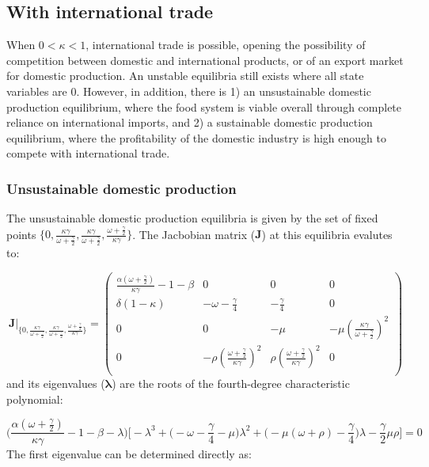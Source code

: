\documentclass[12pt]{article}
\begin{document}
\subsection{With international trade}
When $0 < \kappa < 1$, international trade is possible, opening the possibility of competition between domestic and international products, or of an export market for domestic production. An unstable equilibria still exists where all state variables are 0. However, in addition, there is 1) an unsustainable domestic production equilibrium, where the food system is viable overall through complete reliance on international imports, and 2) a sustainable domestic production equilibrium, where the profitability of the domestic industry is high enough to compete with international trade.

\subsubsection{Unsustainable domestic production}

The unsustainable domestic production equilibria is given by the set of fixed points $\{0, \frac{\kappa \gamma}{\omega + \frac{\gamma}{2}}, \frac{\kappa \gamma}{\omega + \frac{\gamma}{2}}, \frac{\omega + \frac{\gamma}{2}}{\kappa \gamma}\}$. The Jacbobian matrix ($\boldsymbol{J}$) at this equilibria evalutes to:

\begin{equation}
  \boldsymbol{J} \Big |_{\big \{0, \frac{\kappa \gamma}{\omega + \frac{\gamma}{2}}, \frac{\kappa \gamma}{\omega + \frac{\gamma}{2}}, \frac{\omega + \frac{\gamma}{2}}{\kappa \gamma}\big \}} =
  \begin{pmatrix}
    \frac{\alpha(\omega + \frac{\gamma}{2})}{\kappa \gamma} - 1 - \beta   &    0     &     0    &  0 \\
    \delta (1 - \kappa) & - \omega - \frac{\gamma}{4}  &  - \frac{\gamma}{4} & 0 \\
    0      &           0            & -\mu     & - \mu (\frac{\kappa \gamma}{\omega + \frac{\gamma}{2}})^2\\
    0      &   - \rho (\frac{\omega + \frac{\gamma}{2}}{\kappa \gamma})^2    & \rho (\frac{\omega + \frac{\gamma}{2}}{\kappa \gamma})^2 & 0 \\
  \end{pmatrix}
\end{equation}
%
and its eigenvalues ($\boldsymbol{\lambda}$) are the roots of the fourth-degree characteristic polynomial:

\begin{equation}
  \Big(\frac{\alpha(\omega + \frac{\gamma}{2})}{\kappa \gamma} - 1 - \beta - \lambda\Big) \Big[ - \lambda^3 + \big(-\omega - \frac{\gamma}{4} - \mu\big) \lambda^2 + \big(- \mu(\omega + \rho) - \frac{\gamma}{4}\big) \lambda - \frac{\gamma}{2} \mu \rho\Big] = 0
\end{equation}
%
The first eigenvalue can be determined directly as:
\end{document}
